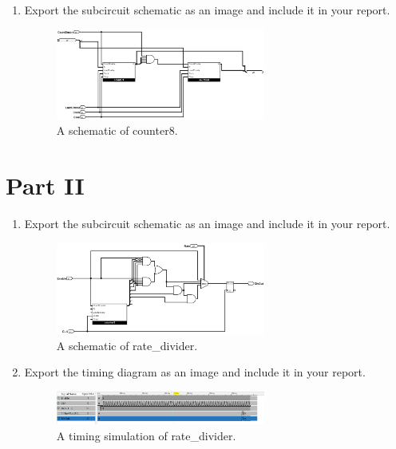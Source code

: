 \documentclass{article}
\begin{document}
\begin{enumerate}
\item Export the subcircuit schematic as an image and include it in your report.

\begin{figure}[ht!]
    \centering
    \includegraphics[width=0.65\textwidth]{lab5_counter8.png}
    \caption{A schematic of counter8.}
    \label{f:counter8}
\end{figure}

\end{enumerate}

\section{Part II}

\begin{enumerate}
\item Export the subcircuit schematic as an image and include it in your report.

\begin{figure}[ht!]
    \centering
    \includegraphics[width=0.65\textwidth]{lab5_rate_divider.png}
    \caption{A schematic of rate\_divider.}
    \label{f:rate_divider}
\end{figure}

\item Export the timing diagram as an image and include it in your report.

\begin{figure}[ht!]
    \centering
    \includegraphics[width=0.65\textwidth]{lab5_timing_rate_divider.png}
    \caption{A timing simulation of rate\_divider.}
    \label{f:rate_divider_timing}
\end{figure}
\end{enumerate}
\end{document}
